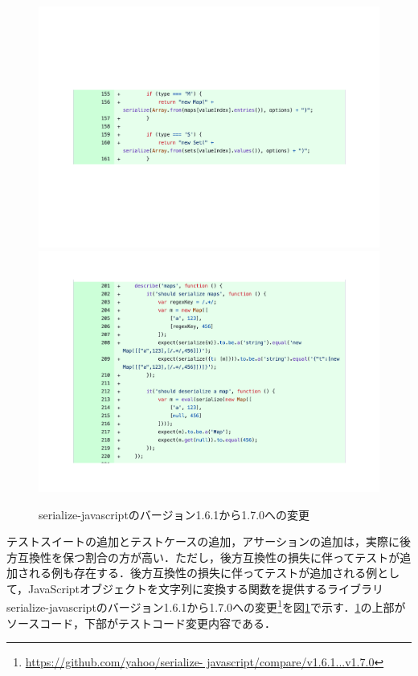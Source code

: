 \documentclass[11pt,dvipdfmx]{jreport}
\begin{document}
\begin{figure}[t]
  \label{fig:rq1.insert-test}
  \centering
  \includegraphics[width=1.0\linewidth]{fig/rq1/set-map/map.pdf}
  \includegraphics[width=1.0\linewidth]{fig/rq1/set-map/map.test.pdf}
  \caption{serialize-javascriptのバージョン1.6.1から1.7.0への変更}
\end{figure}

テストスイートの追加とテストケースの追加，アサーションの追加は，実際に後方互換性を保つ割合の方が高い．ただし，後方互換性の損失に伴ってテストが追加される例も存在する．後方互換性の損失に伴ってテストが追加される例として，JavaScriptオブジェクトを文字列に変換する関数を提供するライブラリserialize-javascriptのバージョン1.6.1から1.7.0への変更\footnote{\url{https://github.com/yahoo/serialize- javascript/compare/v1.6.1...v1.7.0}}を図\ref{fig:rq1.insert-test}で示す．\ref{fig:rq1.insert-test}の上部がソースコード，下部がテストコード変更内容である．
\end{document}
